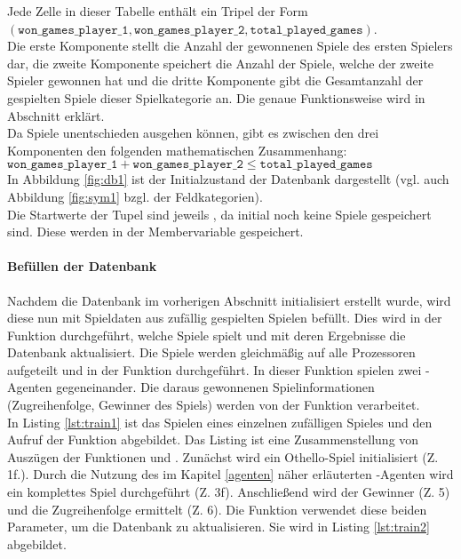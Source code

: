 Jede Zelle in dieser Tabelle enthält ein Tripel der Form \\$( \mathtt{won\_games\_player\_1}, \mathtt{won\_games\_player\_2}, \mathtt{total\_played\_games})$. 
\\Die erste Komponente stellt die Anzahl der gewonnenen Spiele des ersten Spielers dar, die zweite Komponente speichert die Anzahl der Spiele, welche der zweite Spieler gewonnen hat und die dritte Komponente gibt die Gesamtanzahl der gespielten Spiele dieser Spielkategorie an. Die genaue Funktionsweise wird in Abschnitt  erklärt.
\\Da Spiele unentschieden ausgehen können, gibt es zwischen den drei Komponenten den folgenden mathematischen Zusammenhang: 
\\$\mathtt{won\_games\_player\_1} + \mathtt{won\_games\_player\_2} \le \mathtt{total\_played\_games}$
\\In Abbildung \ref{fig:db1} ist der Initialzustand der Datenbank dargestellt (vgl. auch Abbildung \ref{fig:sym1} bzgl. der Feldkategorien). 
\\
Die Startwerte der Tupel sind jeweils , da initial noch keine Spiele gespeichert sind. Diese werden in der Membervariable  gespeichert.
\paragraph{Befüllen der Datenbank}
\label{para:train1}
Nachdem die Datenbank im vorherigen Abschnitt initialisiert erstellt wurde, wird diese nun mit Spieldaten aus zufällig gespielten Spielen befüllt. Dies wird in der Funktion  durchgeführt, welche  Spiele spielt und mit deren Ergebnisse die Datenbank  aktualisiert. Die  Spiele werden gleichmäßig auf alle Prozessoren aufgeteilt und in der Funktion  durchgeführt. In dieser Funktion spielen zwei -Agenten gegeneinander. Die daraus gewonnenen Spielinformationen (Zugreihenfolge, Gewinner des Spiels) werden von der Funktion  verarbeitet. 
\\In Listing \ref{lst:train1} ist das Spielen eines einzelnen zufälligen Spieles und den Aufruf der Funktion  abgebildet. Das Listing ist eine Zusammenstellung von Auszügen der Funktionen  und . Zunächst wird ein Othello-Spiel initialisiert (Z. 1f.). Durch die Nutzung des im Kapitel \ref{agenten} näher erläuterten -Agenten wird ein komplettes Spiel durchgeführt (Z. 3f). Anschließend wird der Gewinner (Z. 5) und die Zugreihenfolge ermittelt (Z. 6). Die Funktion  verwendet diese beiden Parameter, um die Datenbank zu aktualisieren. Sie wird in Listing \ref{lst:train2} abgebildet.

